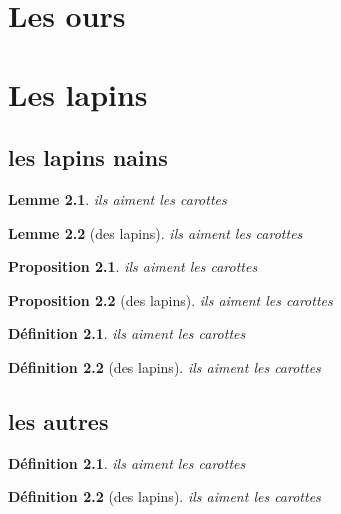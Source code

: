 \documentclass{book}
\newtheorem*{petit_nom}{Lemme}
\newtheorem{petit_nom1}{Proposition}
\newtheorem{petit_nom2}{Définition}[chapter]
\newtheorem{petit_nom3}{Définition}[section]
\begin{document}
\chapter{Les ours}
\chapter{Les lapins}
\section{les lapins nains}
\begin{petit_nom}
ils aiment les carottes
\end{petit_nom}
\begin{petit_nom}[des lapins]
ils aiment les carottes
\end{petit_nom}
\begin{petit_nom1}
ils aiment les carottes
\end{petit_nom1}
\begin{petit_nom1}[des lapins]
ils aiment les carottes
\end{petit_nom1}
\begin{petit_nom2}
ils aiment les carottes
\end{petit_nom2}
\begin{petit_nom2}[des lapins]
ils aiment les carottes
\end{petit_nom2}
\section{les autres}
\begin{petit_nom3}
ils aiment les carottes
\end{petit_nom3}
\begin{petit_nom3}[des lapins]
ils aiment les carottes
\end{petit_nom3}
\end{document}
